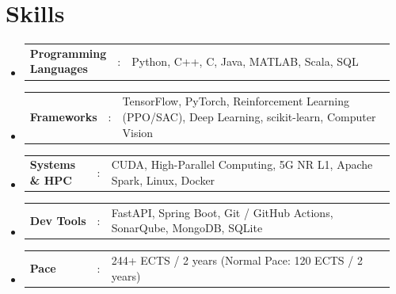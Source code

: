 \documentclass[a4paper,11pt]{article}
\newcommand{\resumeSectionType}[3]{
  \item\begin{tabular*}{0.96\textwidth}[t]{
    p{0.18\linewidth}p{0.02\linewidth}p{0.76\linewidth}
  }
    \textbf{#1} & #2 & #3
  \end{tabular*}\vspace{-2pt}
}
\newcommand{\resumeHeadingListStart}{
  \begin{itemize}[leftmargin=0.15in, label={}]
}
\newcommand{\resumeHeadingListEnd}{\end{itemize}}
\begin{document}
\section{Skills}
  \resumeHeadingListStart{}
    \resumeSectionType{Programming Languages}{:}{Python, C++, C, Java, MATLAB, Scala, SQL}
    \resumeSectionType{Frameworks}{:}{TensorFlow, PyTorch, Reinforcement Learning (PPO/SAC), Deep Learning, scikit-learn, Computer Vision}
    \resumeSectionType{Systems \& HPC}{:}{CUDA, High-Parallel Computing, 5G NR L1, Apache Spark, Linux, Docker}
    \resumeSectionType{Dev Tools}{:}{FastAPI, Spring Boot, Git / GitHub Actions, SonarQube, MongoDB, SQLite}
    \resumeSectionType{Pace}{:}{244+ ECTS / 2 years (Normal Pace: 120 ECTS / 2 years)}
  \resumeHeadingListEnd{}

\end{document}
